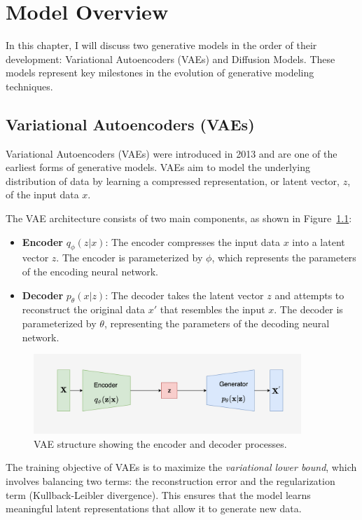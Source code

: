 \chapter{Model Overview}

In this chapter, I will discuss two generative models in the order of their development: Variational Autoencoders (VAEs) and Diffusion Models. These models represent key milestones in the evolution of generative modeling techniques.

\section{Variational Autoencoders (VAEs)}

Variational Autoencoders (VAEs) were introduced in 2013 and are one of the earliest forms of generative models. VAEs aim to model the underlying distribution of data by learning a compressed representation, or latent vector, \(z\), of the input data \(x\).

The VAE architecture consists of two main components, as shown in Figure~\ref{fig:VAE_structure}:
\begin{itemize}
  \item \textbf{Encoder} \( q_\phi(z|x) \): The encoder compresses the input data \(x\) into a latent vector \(z\). The encoder is parameterized by \(\phi\), which represents the parameters of the encoding neural network.
  \item \textbf{Decoder} \( p_\theta(x|z) \): The decoder takes the latent vector \(z\) and attempts to reconstruct the original data \(x'\) that resembles the input \(x\). The decoder is parameterized by \(\theta\), representing the parameters of the decoding neural network.
\end{itemize}

\begin{figure}[h]
    \centering
    \includegraphics[width=0.9\textwidth]{./Images/VAE_structure.jpg}
    \caption{VAE structure showing the encoder and decoder processes.}
    \label{fig:VAE_structure}
\end{figure}

The training objective of VAEs is to maximize the \textit{variational lower bound}, which involves balancing two terms: the reconstruction error and the regularization term (Kullback-Leibler divergence). This ensures that the model learns meaningful latent representations that allow it to generate new data.

